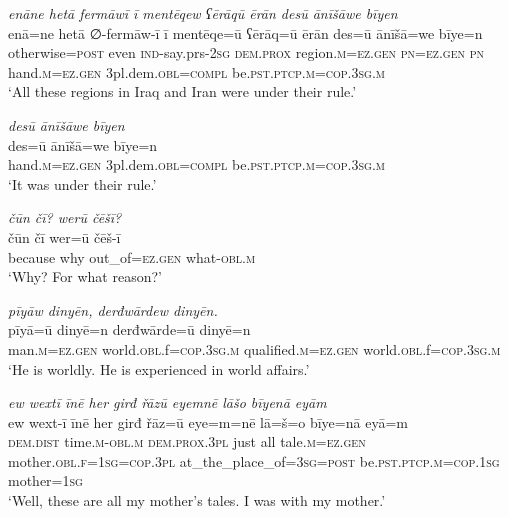 \ea \label{ŠJ.102}
\textit{enāne hetā fermāwī ī mentēqew ʕērāqū ērān desū ānīšāwe bīyen} \\ 
\gll enā=ne hetā ∅-fermāw-ī ī mentēqe=ū ʕērāq=ū ērān des=ū ānīšā=we bīye=n \\ 
 otherwise\textsc{=\textsc{post}} even \textsc{ind-}say.prs-\textsc{2sg} \textsc{dem.prox} region\textsc{.m}\textsc{=ez.gen} \textsc{pn}\textsc{=ez.gen} \textsc{pn} hand\textsc{.m}\textsc{=ez.gen} 3pl.dem\textsc{.obl}\textsc{=compl} be\textsc{.pst}\textsc{.ptcp}\textsc{.m}\textsc{=cop}\textsc{.3sg}\textsc{.m} \\ 
\glt `All these regions in Iraq and Iran were under their rule.'
\z 
 
\ea \label{ŠJ.103}
\textit{desū ānīšāwe bīyen} \\ 
\gll des=ū ānīšā=we bīye=n \\ 
 hand\textsc{.m}\textsc{=ez.gen} 3pl.dem\textsc{.obl}\textsc{=compl} be\textsc{.pst}\textsc{.ptcp}\textsc{.m}\textsc{=cop}\textsc{.3sg}\textsc{.m} \\ 
\glt `It was under their rule.'
\z 
 
\ea \label{ŠJ.106}
\textit{čūn čī? werū čēšī?} \\ 
\gll čūn čī wer=ū čēš-ī \\ 
 because why out\_of\textsc{=ez.gen} what\textsc{-obl}\textsc{.m} \\ 
\glt `Why? For what reason?'
\z 
 
\ea \label{ŠJ.107}
\textit{pīyāw dinyēn, derđwārdew dinyēn.} \\ 
\gll pīyā=ū dinyē=n derđwārde=ū dinyē=n \\ 
 man\textsc{.m}\textsc{=ez.gen} world\textsc{.obl}.f\textsc{=cop}\textsc{.3sg}\textsc{.m} qualified\textsc{.m}\textsc{=ez.gen} world\textsc{.obl}.f\textsc{=cop}\textsc{.3sg}\textsc{.m} \\ 
\glt `He is worldly. He is experienced in world affairs.'
\z 
 
\ea \label{KŠ.1}
\textit{ew wextī īnē her girđ řāzū eyemnē lāšo bīyenā eyām} \\ 
\gll ew wext-ī īnē her girđ řāz=ū eye=m=nē lā=š=o bīye=nā eyā=m \\ 
 \textsc{dem.dist} time\textsc{.m}\textsc{-obl}\textsc{.m} \textsc{dem.prox}\textsc{.3pl} just all tale\textsc{.m}\textsc{=ez.gen} mother\textsc{.obl}\textsc{.f}\textsc{=\textsc{1sg}}\textsc{=cop}\textsc{.3pl} at\_the\_place\_of\textsc{=3sg}\textsc{=\textsc{post}} be\textsc{.pst}\textsc{.ptcp}\textsc{.m}\textsc{=cop}\textsc{.\textsc{1sg}} mother\textsc{=\textsc{1sg}} \\ 
\glt `Well, these are all my mother’s tales. I was with my mother.'
\z 
 

